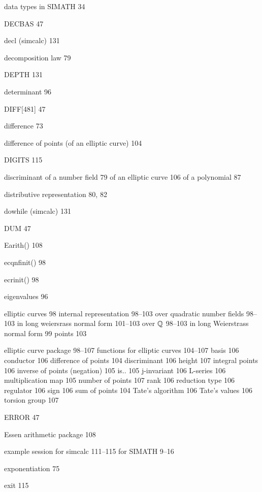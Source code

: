 \begin{theindex}
\indexspace

\item data types in SIMATH 34
\item DECBAS 47
\item decl (simcalc) 131
\item decomposition law 79
\item DEPTH 131
\item determinant 96
\item DIFF[481] 47
\item difference 73
\item difference of points (of an elliptic curve) 104
\item DIGITS 115
\item discriminant
  \subitem of a number field 79
  \subitem of an elliptic curve 106
  \subitem of a polynomial 87
\item distributive representation 80, 82
\item dowhile (simcalc) 131
\item DUM 47

\indexspace

\item Earith() 108
\item ecqnfinit() 98
\item ecrinit() 98
\item eigenvalues 96
\item elliptic curves 98
  \subitem internal representation 98--103
  \subitem over quadratic number fields 98--103
    \subsubitem in long weiersrass normal form 101--103
  \subitem over $\mbox{$\mathbb Q$}$ 98--103
    \subsubitem in long Weierstrass normal form 99
  \subitem points 103
\item elliptic curve package 98--107
  \subitem functions for elliptic curves 104--107
    \subsubitem basis 106
    \subsubitem conductor 106
    \subsubitem difference of points 104
    \subsubitem discriminant 106
    \subsubitem height 107
    \subsubitem integral points 106
    \subsubitem inverse of points (negation) 105
    \subsubitem is.. 105
    \subsubitem j-invariant 106
    \subsubitem L-series 106
    \subsubitem multiplication map 105
    \subsubitem number of points 107
    \subsubitem rank 106
    \subsubitem reduction type 106
    \subsubitem regulator 106
    \subsubitem sign 106
    \subsubitem sum of points 104
    \subsubitem Tate's algorithm 106
    \subsubitem Tate's values 106
    \subsubitem torsion group 107
\item ERROR 47
\item Essen arithmetic package 108
\item example session 
  \subitem for simcalc 111--115
  \subitem for SIMATH 9--16
\item exponentiation 75
\item exit 115


\end{theindex}
